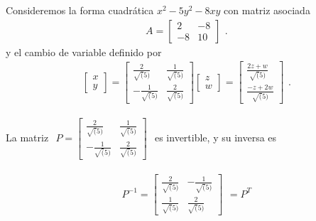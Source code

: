 \begin{example}
Consideremos la forma cuadrática $x^{2} - 5y^{2} - 8xy$ con matriz asociada
\begin{equation*}
    \begin{matrix} 
    A = \begin{bmatrix}
2 & -8\\
-8 & 10
\end{bmatrix}
    \end{matrix}.
\end{equation*}
y el cambio de variable definido por
\begin{equation*}
    \begin{matrix} 
    \begin{bmatrix}
        x\\
        y
    \end{bmatrix} = \begin{bmatrix}
    \frac{2}{\sqrt(5)} & \frac{1}{\sqrt(5)}\\
    -\frac{1}{\sqrt(5)} & \frac{2}{\sqrt(5)}
    \end{bmatrix}\begin{bmatrix}
    z\\
    w
    \end{bmatrix} = \begin{bmatrix}
        \frac{2z + w}{\sqrt(5)}\\
        \frac{-z + 2w}{\sqrt(5)}
        \end{bmatrix}
    \end{matrix}.
\end{equation*}

La matriz $ \begin{matrix} 
    P = \begin{bmatrix}
\frac{2}{\sqrt(5)} & \frac{1}{\sqrt(5)}\\
-\frac{1}{\sqrt(5)} & \frac{2}{\sqrt(5)}
\end{bmatrix}
    \end{matrix}$ es invertible, y su inversa es 

\begin{equation*}
    \begin{matrix} 
    P^{-1} = \begin{bmatrix}
\frac{2}{\sqrt(5)} & -\frac{1}{\sqrt(5)}\\
\frac{1}{\sqrt(5)} & \frac{2}{\sqrt(5)}
\end{bmatrix}
    \end{matrix} = P^{T}
\end{equation*}


\end{example}
